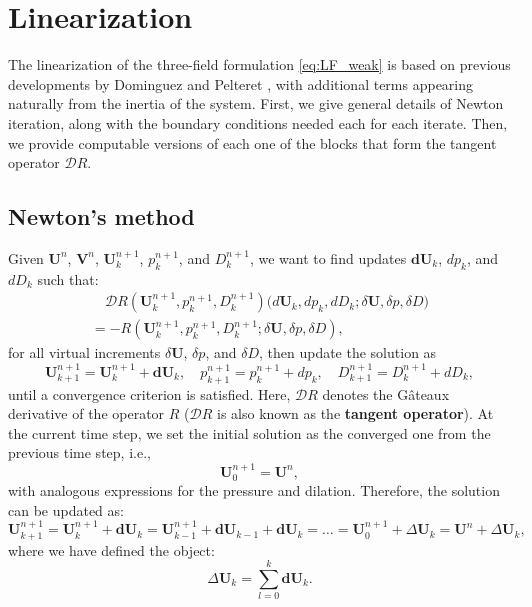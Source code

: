 \documentclass{sfuthesis}
\numberwithin{equation}{section}
\numberwithin{figure}{chapter}
\numberwithin{table}{chapter}
\theoremstyle{definition}
\def\*#1{{\mathbf{#1}}} %
\renewcommand{\c}{\mathbbm{c}}
\begin{document}
\section{Linearization}

The linearization of the three-field formulation \eqref{eq:LF_weak} is based on previous developments by Dominguez \cite{Seba} and Pelteret \cite{PelteretThesis}, with additional terms appearing naturally from the inertia of the system. First, we give general details of Newton iteration, along with the boundary conditions needed each for each iterate. Then, we provide computable versions of each one of the blocks that form the tangent operator $\bm{\mathcal{D}}R$.

\subsection{Newton's method}

Given $\*U^n$, $\*V^n$, $\*U^{n+1}_k$, $p^{n+1}_k$, and $D^{n+1}_k$, we want to find updates $\*d \*U_k$, $d p_k$, and $d D_k$ such that:
\begin{multline} \label{eq:newton}
    \quad \bm{\mathcal{D}}R(\*U^{n+1}_k, p^{n+1}_k, D^{n+1}_k) \Big(d \*U_k, d p_k, d D_k ; \delta \*U, \delta p, \delta D \Big) \\
    = - R(\*U^{n+1}_k, p^{n+1}_k, D^{n+1}_k ; \delta \*U, \delta p, \delta D), \quad
\end{multline}
for all virtual increments $\delta \*U$, $\delta p$, and $\delta D$, then update the solution as
\begin{equation} \label{eq:update_theory}
\*U^{n+1}_{k+1} = \*U^{n+1}_k + \*d \*U_k, \quad 
p^{n+1}_{k+1} = p^{n+1}_k + d p_k, \quad 
D^{n+1}_{k+1} = D^{n+1}_k + d D_k,
\end{equation}
until a convergence criterion is satisfied. Here, $\bm{\mathcal{D}} R$ denotes the G\^{a}teaux derivative of the operator $R$ ($\bm{\mathcal{D}} R$ is also known as the \textbf{tangent operator}). At the current time step, we set the initial solution as the converged one from the previous time step, i.e.,
\begin{equation}
\*U_0^{n+1} = \*U^n,
\end{equation}
with analogous expressions for the pressure and dilation. Therefore, the solution can be updated as:
\begin{equation} \label{eq:update_practice}
\*U^{n+1}_{k+1} = \*U^{n+1}_k + \*d\*U_k = \*U^{n+1}_{k-1} + \*d\*U_{k-1} + \*d \*U_k = \dots = \*U_0^{n+1} + \Delta \*U_k = \*U^n + \Delta \*U_k,
\end{equation}
where we have defined the object:
\begin{equation}
\Delta \*U_k = \sum_{l = 0}^k \*d \*U_k.
\end{equation}
\end{document}
